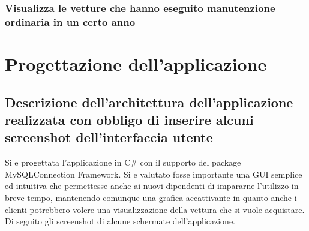 \documentclass[11pt]{article}
\begin{document}
\subsubsection*{Visualizza le vetture che hanno eseguito manutenzione ordinaria in un certo anno}

\section{Progettazione dell'applicazione}

\subsection{Descrizione dell'architettura dell'applicazione realizzata con
obbligo di inserire alcuni screenshot dell'interfaccia utente}

Si e progettata l'applicazione in C\# con il supporto del package
MySQLConnection Framework. Si e valutato fosse importante una GUI semplice ed
intuitiva che permettesse anche ai nuovi dipendenti di impararne l'utilizzo in
breve tempo, mantenendo comunque una grafica accattivante in quanto anche i
clienti potrebbero volere una visualizzazione della vettura che si vuole
acquistare.\\
Di seguito gli screenshot di alcune schermate dell'applicazione.
\end{document}
